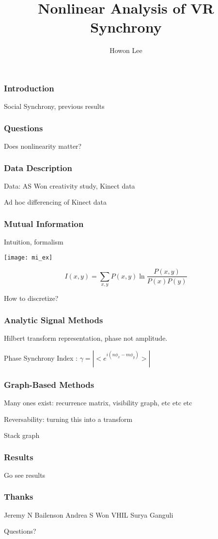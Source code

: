 \documentclass{beamer}
\begin{document}
\title{Nonlinear Analysis of VR Synchrony}
\author{Howon Lee}
\maketitle

\begin{frame}
  \frametitle{Introduction}
  Social Synchrony, previous results
\end{frame}
\begin{frame}
  \frametitle{Questions}
  Does nonlinearity matter?
\end{frame}
\begin{frame}
  \frametitle{Data Description}
  Data: AS Won creativity study, Kinect data

  Ad hoc differencing of Kinect data
\end{frame}
\begin{frame}
  \frametitle{Mutual Information}
  Intuition, formalism

  \texttt{[image: mi\_ex]}
  
  $$I(x,y) = \sum_{x,y}P(x,y) \ln \frac{P(x,y)}{P(x)P(y)}$$

  How to discretize?
\end{frame}
\begin{frame}
  \frametitle{Analytic Signal Methods}
  Hilbert transform representation, phase not amplitude.

  Phase Synchrony Index : $\gamma = |<e^{i(n\phi_x - m\phi_y)}>|$
\end{frame}
\begin{frame}
  \frametitle{Graph-Based Methods}
  Many ones exist: recurrence matrix, visibility graph, etc etc etc

  Reversability: turning this into a transform

  Stack graph
\end{frame}
\begin{frame}
  \frametitle{Results}
  Go see results
\end{frame}
\begin{frame}
  \frametitle{Thanks}
  Jeremy N Bailenson
  Andrea S Won
  VHIL
  Surya Ganguli
\end{frame}
\begin{frame}
  Questions?
\end{frame}
\end{document}
